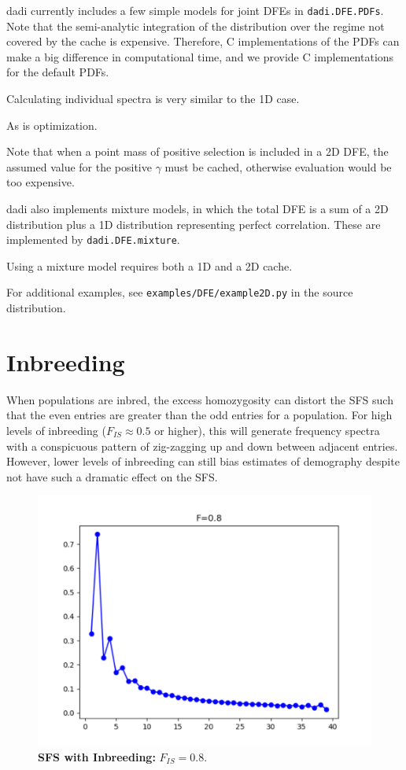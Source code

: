 \documentclass[12pt]{article}
\newcommand{\dadi}{dadi\xspace}
\begin{document}
\dadi currently includes a few simple models for joint DFEs in \texttt{dadi.DFE.PDFs}.
Note that the semi-analytic integration of the distribution over the regime not covered by the cache is expensive.
Therefore, C implementations of the PDFs can make a big difference in computational time, and we provide
C implementations for the default PDFs.

Calculating individual spectra is very similar to the 1D case.

As is optimization.

Note that when a point mass of positive selection is included in a 2D DFE, the assumed value for the positive $\gamma$ must be cached, otherwise evaluation would be too expensive.

\dadi also implements mixture models, in which the total DFE is a sum of a 2D distribution plus a 1D distribution representing perfect correlation.
These are implemented by \texttt{dadi.DFE.mixture}.

Using a mixture model requires both a 1D and a 2D cache.

For additional examples, see \texttt{examples/DFE/example2D.py} in the source distribution.

\section{Inbreeding}\label{inbreeding}

When populations are inbred, the excess homozygosity can distort the SFS such that the even entries are greater than the odd entries for a population.
For high levels of inbreeding ($F_{IS} \approx 0.5$ or higher), this will generate frequency spectra with a conspicuous pattern of zig-zagging up and down between adjacent entries.
However, lower levels of inbreeding can still bias estimates of demography despite not have such a dramatic effect on the SFS.

\begin{figure}[h]
\centering
\includegraphics[scale=0.5]{InbreedingSFS}
\caption{\textbf{SFS with Inbreeding:} $F_{IS}=0.8$.\label{fig:inbreeding_sfs}}
\end{figure}
\end{document}
